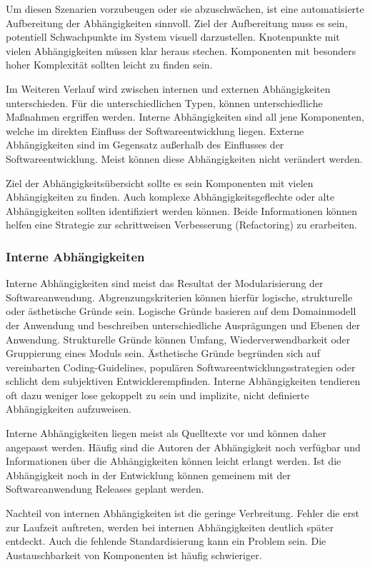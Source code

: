 Um diesen Szenarien vorzubeugen oder sie abzuschwächen, ist eine automatisierte Aufbereitung der Abhängigkeiten sinnvoll. Ziel der Aufbereitung muss es sein, potentiell Schwachpunkte im System visuell darzustellen. Knotenpunkte mit vielen Abhängigkeiten müssen klar heraus stechen. Komponenten mit besonders hoher Komplexität sollten leicht zu finden sein.

Im Weiteren Verlauf wird zwischen internen und externen Abhängigkeiten unterschieden. Für die unterschiedlichen Typen, können unterschiedliche Maßnahmen ergriffen werden. Interne Abhängigkeiten sind all jene Komponenten, welche im direkten Einfluss der Softwareentwicklung liegen. Externe Abhängigkeiten sind im Gegensatz außerhalb des Einflusses der Softwareentwicklung. Meist können diese Abhängigkeiten nicht verändert werden.

Ziel der Abhängigkeitsübersicht sollte es sein Komponenten mit vielen Abhängigkeiten zu finden. Auch komplexe Abhängigkeitsgeflechte oder alte Abhängigkeiten sollten identifiziert werden können. Beide Informationen können helfen eine Strategie zur schrittweisen Verbesserung (\gls{Refactoring}) zu erarbeiten.

\subsubsection{Interne Abhängigkeiten}

Interne Abhängigkeiten sind meist das Resultat der Modularisierung der Softwareanwendung. Abgrenzungskriterien können hierfür logische, strukturelle oder ästhetische Gründe sein. Logische Gründe basieren auf dem Domainmodell der Anwendung und beschreiben unterschiedliche Ausprägungen und Ebenen der Anwendung. Strukturelle Gründe können Umfang, Wiederverwendbarkeit oder Gruppierung eines Moduls sein. Ästhetische Gründe begründen sich auf vereinbarten Coding-Guidelines, populären Softwareentwicklungsstrategien oder schlicht dem subjektiven Entwicklerempfinden. Interne Abhängigkeiten tendieren oft dazu weniger lose gekoppelt zu sein und implizite, nicht definierte Abhängigkeiten aufzuweisen.

Interne Abhängigkeiten liegen meist als Quelltexte vor und können daher angepasst werden. Häufig sind die Autoren der Abhängigkeit noch verfügbar und Informationen über die Abhängigkeiten können leicht erlangt werden.
Ist die Abhängigkeit noch in der Entwicklung können gemeinem mit der Softwareanwendung Releases geplant werden. 

Nachteil von internen Abhängigkeiten ist die geringe Verbreitung. Fehler die erst zur Laufzeit auftreten, werden bei internen Abhängigkeiten deutlich später entdeckt. Auch die fehlende Standardisierung kann ein Problem sein. Die Austauschbarkeit von Komponenten ist häufig schwieriger.

